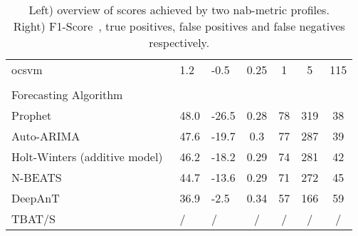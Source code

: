 \begin{table}[h]
{\begin{tabular}{lll|cccc}
            \acrshort{ocsvm}~\cite{Schölkopf.1999,Tax.2004}                 & 1.2               & -0.5              & 0.25    & 1     & 5     & 115   \\
            \\
            Forecasting Algorithm                                           &                   &                   &         &       &       &       \\\hline
            Prophet~\cite{Taylor.2017}                                      & 48.0              & -26.5             & 0.28    & 78    & 319   & 38    \\
            Auto-ARIMA~\cite{Smith.2017}                                    & 47.6              & -19.7             & 0.3     & 77    & 287   & 39    \\
            Holt-Winters (additive model)~\cite{Winters.1960}               & 46.2              & -18.2             & 0.29    & 74    & 281   & 42    \\
            N-BEATS~\cite{Oreshkin.2020}                                    & 44.7              & -13.6             & 0.29    & 71    & 272   & 45    \\
            DeepAnT~\cite{Munir.2019}                                       & 36.9              & -2.5              & 0.34    & 57    & 166   & 59    \\
            TBAT/S                                                          & /                 & /                 & /     & /     & /     & /     \\
        \end{tabular}
    }
    \caption[NAB-Scores achieved by the algorithms]{
    Left) overview of scores achieved by two \gls{nab}-metric profiles.
    \\Right) F1-Score~\cite[183]{Murphy.2012}, true positives, false positives
    and false negatives respectively.}\label{tab:results}
\end{table}